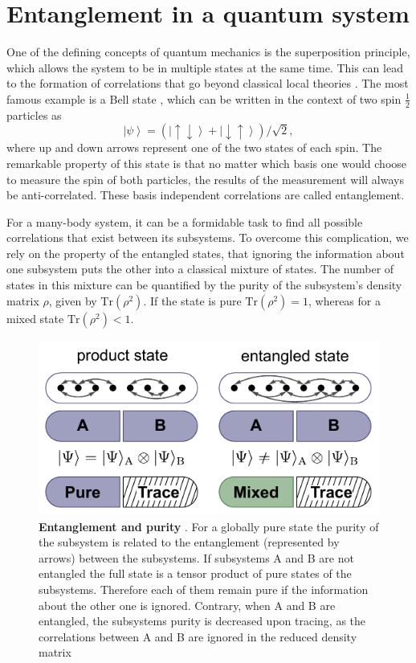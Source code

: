 \section{Entanglement in a quantum system}
One of the defining concepts of quantum mechanics is the superposition principle, which allows the system to be in multiple states at the same time. This can lead to the formation of correlations that go beyond classical local theories \cite{Horodecki2009}. The most famous example is a Bell state \cite{Bell1964}, which can be written in the context of two spin $\frac{1}{2}$ particles as 
\begin{equation}
\left| \psi \right>=(\left| \uparrow \downarrow \right>+ \left| \downarrow \uparrow \right>)/\sqrt{2},
\end{equation}
where up and down arrows represent one of the two states of each spin. The remarkable property of this state is that no matter which basis one would choose to measure the spin of both particles, the results of the measurement will always be anti-correlated. These basis independent correlations are called entanglement.

For a many-body system, it can be a formidable task to find all possible correlations that exist between its subsystems. To overcome this complication, we rely on the property of the entangled states, that ignoring the information about one subsystem puts the other into a classical mixture of states. The number of states in this mixture can be quantified by the purity of the subsystem's density matrix $\rho$, given by $\textrm{Tr}(\rho^2)$. If the state is pure $\textrm{Tr}(\rho^2)=1$, whereas for a mixed state $\textrm{Tr}(\rho^2)<1$.

\begin{figure}[t!]
	\centering
	\includegraphics[scale=1]{figures/ETH_entanglemet.pdf}
	\caption{{\bf Entanglement and purity }. For a globally pure state the purity of the subsystem is related to the entanglement (represented by arrows) between the subsystems. If subsystems A and B are not entangled the full state is a tensor product of pure states of the subsystems. Therefore each of them remain pure if the information about the other one is ignored. Contrary, when A and B are entangled, the subsystems purity is decreased upon tracing, as the correlations between A and B are ignored in the reduced density matrix }
	\label{fig:ETH_entanglemet}
\end{figure}  

